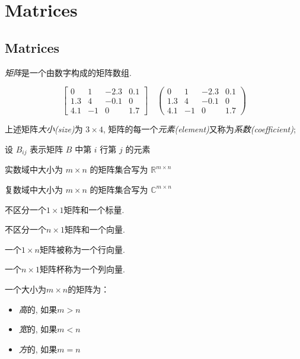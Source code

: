 \chapter{Matrices}

\section{Matrices}

\begin{definition}[矩阵]
    \textit{矩阵}是一个由数字构成的矩阵数组. 

    $$ \left[\begin{array}{cccc}0 & 1 & -2.3 & 0.1 \\ 1.3 & 4 & -0.1 & 0 \\ 4.1 & -1 & 0 & 1.7\end{array}\right] \quad  \left(\begin{array}{cccc}0 & 1 & -2.3 & 0.1 \\ 1.3 & 4 & -0.1 & 0 \\ 4.1 & -1 & 0 & 1.7\end{array}\right)  $$

    上述矩阵\textit{大小(size)}为 $3\times 4$, 矩阵的每一个\textit{元素(element)}又称为\textit{系数(coefficient)};
\end{definition}

\begin{notation}
    设 $ B_{i j} $ 表示矩阵 $ B $ 中第 $ i $ 行第 $ j $ 的元素

    实数域中大小为 $ m \times n $ 的矩阵集合写为 $ \mathbb{R}^{m \times n} $

    复数域中大小为 $ m \times n $ 的矩阵集合写为 $ \mathbb{C}^{m \times n} $
\end{notation}

\begin{definition}[标量]
    不区分一个$1\times 1$矩阵和一个标量. 
\end{definition}

\begin{definition}[向量]
    不区分一个$n\times 1$矩阵和一个向量. 
\end{definition}

\begin{definition}
    一个$1\times n$矩阵被称为一个行向量. 
    
    一个$n\times 1$矩阵杯称为一个列向量. 
\end{definition}

\begin{definition}[高形, 宽形和方形矩阵]
    一个大小为$m\times n$的矩阵为：
    \begin{itemize}
        \item \textit{高}的, 如果$m>n$
        \item \textit{宽}的, 如果$m<n$
        \item \textit{方}的, 如果$m=n$
    \end{itemize}
\end{definition}

